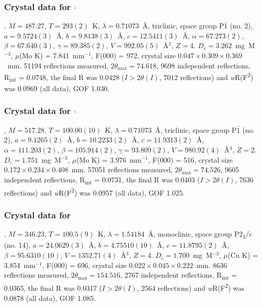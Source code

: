 \begin{refsection}
\subsubsection{Crystal data for \texorpdfstring{$\cdot$}{C22 H20 Br N2 O Se}}
, $M=487.27$, $T=293(2)$~K, $\lambda=0.71073$~\AA, triclinic, space group P$\bar{1}$ (no. 2), $a = 9.5724(3)$~\AA, $b = 9.8138(3)$~\AA, $c = 12.5411(3)$~\AA, $\alpha = 67.273(2)$\degree, $\beta = 67.640(3)$\degree, $\gamma = 89.385(2)$\degree, $V = 992.05(5)$~\AA$^{3}$, $Z = 4$. $D_{c}= 3.262$~mg~M$^{-3}$, $\mu$(Mo K\a) = 7.841~mm$^{-1}$, F(000) = 972, crystal size $0.047 \times 0.309 \times 0.369$~mm. 51194 reflections measured, $2\theta_{\mathrm{max}}=74.618$\degree, 9698 independent reflections, R\textsubscript{int} = 0.0748, the final R was 0.0428 ($I > 2\theta(I)$, 7012 reflections) and \emph{w}R(F\textsuperscript{2}) was 0.0969 (all data), GOF 1.030.

\subsubsection{Crystal data for \texorpdfstring{$\cdot$}{C22 H20 Br N3 O2 Se}}
, $M=517.28$, $T=100.00(10)$~K, $\lambda=0.71073$~\AA, triclinic, space group P$\bar{1}$ (no. 2), $a = 9.1265(2)$~\AA, $b = 10.2233(2)$~\AA, $c = 11.9313(2)$~\AA, $\alpha = 111.203(2)$\degree, $\beta = 105.914(2)$\degree, $\gamma = 93.809(2)$\degree, $V = 980.92(4)$~\AA$^{3}$, $Z = 2$. $D_{c}= 1.751$~mg~M$^{-3}$, $\mu$(Mo K\a) = 3.976~mm$^{-1}$, F(000) = 516, crystal size $0.172 \times 0.234 \times 0.408$~mm. 57051 reflections measured, $2\theta_{\mathrm{max}}=74.526$\degree, 9605 independent reflections, R\textsubscript{int} = 0.0731, the final R was 0.0403 ($I > 2\theta(I)$, 7636 reflections) and \emph{w}R(F\textsuperscript{2}) was 0.0957 (all data), GOF 1.025.

\subsubsection{Crystal data for \texorpdfstring{}{C16 H13 N O3 Se}}
, $M=346.23$, $T=100.5(9)$~K, $\lambda=1.54184$~\AA, monoclinic, space group P2\textsubscript{1}/c (no. 14), $a = 24.0629(3)$~\AA, $b = 4.75510(10)$~\AA, $c = 11.8795(2)$~\AA, $\beta = 95.6310(10)$\degree, $V = 1352.71(4)$~\AA$^{3}$, $Z = 4$. $D_{c}= 1.700$~mg~M$^{-3}$, $\mu$(Cu K\a) = 3.854~mm$^{-1}$, F(000) = 696, crystal size $0.022 \times 0.045 \times 0.222$~mm. 8636 reflections measured, $2\theta_{\mathrm{max}}=154.516$\degree, 2767 independent reflections, R\textsubscript{int} = 0.0365, the final R was 0.0317 ($I > 2\theta(I)$, 2564 reflections) and \emph{w}R(F\textsuperscript{2}) was 0.0878 (all data), GOF 1.085.


\end{refsection}
